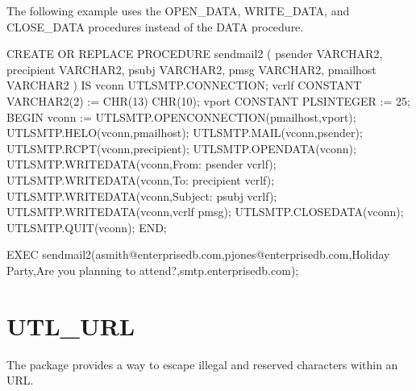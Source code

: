\documentclass[letterpaper,10pt,english,openany,oneside]{sphinxmanual}
\begin{document}
The following example uses the OPEN\_DATA, WRITE\_DATA, and CLOSE\_DATA procedures instead of the DATA procedure.

%
\begin{sphinxVerbatim}[commandchars=\\\{\}]
CREATE OR REPLACE PROCEDURE send\PYGZus{}mail\PYGZus{}2 (
    p\PYGZus{}sender        VARCHAR2,
    p\PYGZus{}recipient     VARCHAR2,
    p\PYGZus{}subj          VARCHAR2,
    p\PYGZus{}msg           VARCHAR2,
    p\PYGZus{}mailhost      VARCHAR2
)
IS
    v\PYGZus{}conn          UTL\PYGZus{}SMTP.CONNECTION;
    v\PYGZus{}crlf          CONSTANT VARCHAR2(2) := CHR(13) \textbar{}\textbar{} CHR(10);
    v\PYGZus{}port          CONSTANT PLS\PYGZus{}INTEGER := 25;
BEGIN
    v\PYGZus{}conn := UTL\PYGZus{}SMTP.OPEN\PYGZus{}CONNECTION(p\PYGZus{}mailhost,v\PYGZus{}port);
    UTL\PYGZus{}SMTP.HELO(v\PYGZus{}conn,p\PYGZus{}mailhost);
    UTL\PYGZus{}SMTP.MAIL(v\PYGZus{}conn,p\PYGZus{}sender);
    UTL\PYGZus{}SMTP.RCPT(v\PYGZus{}conn,p\PYGZus{}recipient);
    UTL\PYGZus{}SMTP.OPEN\PYGZus{}DATA(v\PYGZus{}conn);
    UTL\PYGZus{}SMTP.WRITE\PYGZus{}DATA(v\PYGZus{}conn,\PYGZsq{}From: \PYGZsq{} \textbar{}\textbar{} p\PYGZus{}sender \textbar{}\textbar{} v\PYGZus{}crlf);
    UTL\PYGZus{}SMTP.WRITE\PYGZus{}DATA(v\PYGZus{}conn,\PYGZsq{}To: \PYGZsq{} \textbar{}\textbar{} p\PYGZus{}recipient \textbar{}\textbar{} v\PYGZus{}crlf);
    UTL\PYGZus{}SMTP.WRITE\PYGZus{}DATA(v\PYGZus{}conn,\PYGZsq{}Subject: \PYGZsq{} \textbar{}\textbar{} p\PYGZus{}subj \textbar{}\textbar{} v\PYGZus{}crlf);
    UTL\PYGZus{}SMTP.WRITE\PYGZus{}DATA(v\PYGZus{}conn,v\PYGZus{}crlf \textbar{}\textbar{} p\PYGZus{}msg);
    UTL\PYGZus{}SMTP.CLOSE\PYGZus{}DATA(v\PYGZus{}conn);
    UTL\PYGZus{}SMTP.QUIT(v\PYGZus{}conn);
END;

EXEC send\PYGZus{}mail\PYGZus{}2(\PYGZsq{}asmith@enterprisedb.com\PYGZsq{},\PYGZsq{}pjones@enterprisedb.com\PYGZsq{},\PYGZsq{}Holiday Party\PYGZsq{},\PYGZsq{}Are you planning to attend?\PYGZsq{},\PYGZsq{}smtp.enterprisedb.com\PYGZsq{});
\end{sphinxVerbatim}

\newpage


\section{UTL\_URL}
\label{\detokenize{utl_url::doc}}\label{\detokenize{utl_url:utl-url}}
The  package provides a way to escape illegal and reserved
characters within an URL.
\end{document}
